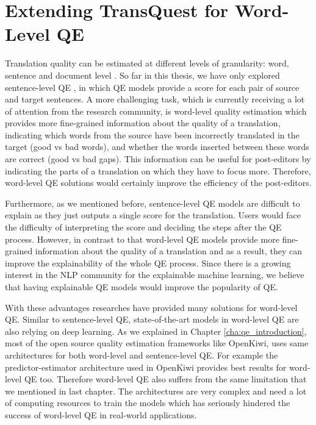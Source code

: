 \chapter{\label{cha:qe_word}Extending TransQuest for Word-Level QE}

Translation quality can be estimated at different levels of granularity: word, sentence and document level \autocite{ive-etal-2018-deepquest}. So far in this thesis, we have only explored sentence-level QE \autocite{specia-etal-2020-findings-wmt}, in which QE models provide a score for each pair of source and target sentences. A more challenging task, which is currently receiving a lot of attention from the research community, is word-level quality estimation which provides more fine-grained information about the quality of a translation, indicating which words from the source have been incorrectly translated in the target (good vs bad words), and whether the words inserted between these words are correct (good vs bad gaps). This information can be useful for post-editors by indicating the parts of a translation on which they have to focus more. Therefore, word-level QE solutions would certainly improve the efficiency of the post-editors.

Furthermore, as we mentioned before, sentence-level QE models are difficult to explain as they just outputs a single score for the translation. Users would face the difficulty of interpreting the score and deciding the steps after the QE process. However, in contrast to that word-level QE models provide more fine-grained information about the quality of a translation and as a result, they can improve the explainability of the whole QE process. Since there is a growing interest in the NLP community for the explainable machine learning, we believe that having explainable QE models would improve the popularity of QE.   

With these advantages researches have provided many solutions for word-level QE. Similar to sentence-level QE, state-of-the-art models in word-level QE are also relying on deep learning. As we explained in Chapter \ref{cha:qe_introduction}, most of the open source quality estimation frameworks like OpenKiwi, uses same architectures for both word-level and sentence-level QE. For example the predictor-estimator architecture used in OpenKiwi provides best results for word-level QE too. Therefore word-level QE also suffers from the same limitation that we mentioned in last chapter. The architectures are very complex and need a lot of computing resources to train the models which has seriously hindered the success of word-level QE in real-world applications.

